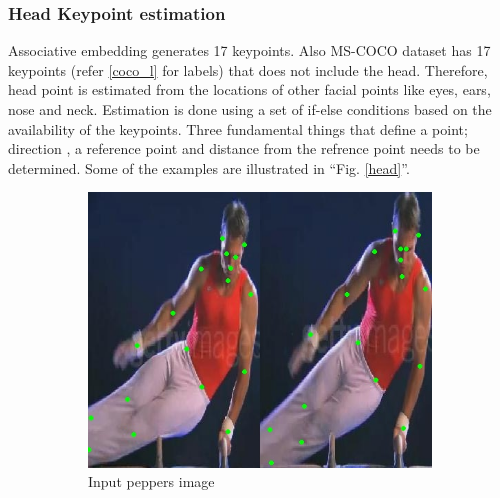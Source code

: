 \documentclass[conference]{IEEEtran}
\begin{document}
\subsubsection{Head Keypoint estimation}
Associative embedding \cite{poseAE} generates 17 keypoints. Also MS-COCO dataset has 17 keypoints (refer \ref{coco_l} for labels) that does not include the head. Therefore, head point is estimated from the locations of other facial points like eyes, ears, nose and neck. Estimation is done using a set of if-else conditions based on the availability of the keypoints. Three fundamental things that define a point; direction , a reference point and distance from the refrence point needs to be determined. Some of the examples are illustrated in ``Fig. \ref{head}''.
\begin{figure}[htbp]{}
\centering
\begin{subfigure}[t]{1.6cm}
\includegraphics[width=\linewidth, height=\linewidth]{dm1} 
\caption{Input peppers image}
\label{cari1}
\end{subfigure}
\begin{subfigure}[t]{1.6cm}

\end{subfigure}
\end{figure}
\end{document}
